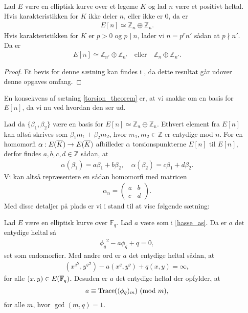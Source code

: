 \begin{thm}
\label{torsion_theorem}
Lad $E$ være en elliptisk kurve over et legeme $K$ og lad $n$ være et positivt heltal. Hvis karakteristikken for $K$ ikke deler $n$, eller ikke er $0$, da er
\begin{align*}
	E[n] \simeq \mathbb{Z}_n \oplus \mathbb{Z}_n.
\end{align*}
Hvis karakteristikken for $K$ er $p > 0$ og $p \mid n$, lader vi $n=p^r n'$ sådan at $p \nmid n'$. Da er
\begin{align*}
	E[n] \simeq \mathbb{Z}_{n'} \oplus \mathbb{Z}_{n'} \quad \text{eller} \quad \mathbb{Z}_n 
	\oplus \mathbb{Z}_{n'}.
\end{align*}
\end{thm}
\begin{proof}
Et bevis for denne sætning kan findes i \cite[s.~79]{Washington}, da dette resultat går udover denne opgaves omfang.
\end{proof}
En konsekvens af sætning \ref{torsion_theorem} er, at vi snakke om en basis for $E[n]$, da vi nu ved hvordan den ser ud.

Lad da $\{\beta_1, \beta_2\}$ være en basis for $E[n] \simeq \mathbb{Z}_n \oplus \mathbb{Z}_n$. Ethvert element fra $E[n]$ kan altså skrives som $\beta_1 m_1 + \beta_2 m_2$, hvor $m_1, m_2 \in \mathbb{Z}$ er entydige mod $n$. For en homomorfi $\alpha : E(\overline{K}) \to E(\overline{K})$ afbilleder $\alpha$ torsionspunkterne $E[n]$ til $E[n]$, derfor findes $a, b, c, d \in \mathbb{Z}$ sådan, at 
\begin{align*}
	\alpha(\beta_1) = a \beta_1 + b \beta_2, \quad \alpha(\beta_2) = c\beta_1 + d \beta_2.
\end{align*}
Vi kan altså repræsentere en sådan homomorfi med matricen
\begin{align*}
	\alpha_n = \left( 
	\begin{matrix}
		a & b \\ 
		c & d 
	\end{matrix} \right).
\end{align*}
Med disse detaljer på plads er vi i stand til at vise følgende sætning:
\begin{thm}
\label{trace_theorem}
Lad $E$ være en elliptisk kurve over $\mathbb{F}_q$. Lad $a$ være som i \eqref{hasse_as}. Da er $a$ det
entydige heltal så
\begin{align*}
	{\phi_q}^2 - a \phi_q + q = 0,
\end{align*}
set som endomorfier. Med andre ord er $a$ det entydige heltal sådan, at 
\begin{align*}
	({x^q}^2, {y^q}^2) - a(x^q, y^q) + q(x, y) = \infty,
\end{align*}
for alle $(x, y) \in E(\overline{\mathbb{F}}_q)$. Desuden er $a$ det entydige heltal der opfylder, at
\begin{align*}
	a \equiv \text{Trace}((\phi_q)_m) \ (\mathrm{mod} \ m),
\end{align*}
for alle $m$, hvor $\gcd(m, q)=1$.
\end{thm}


